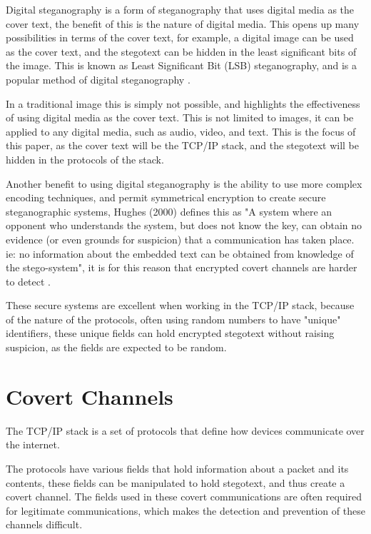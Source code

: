 Digital steganography is a form of steganography that uses digital media as the cover text, the benefit of this is the nature of digital media. This opens up many possibilities in terms of the cover text, for example, a digital image can be used as the cover text, and the stegotext can be hidden in the least significant bits of the image. This is known as Least Significant Bit (LSB) steganography, and is a popular method of digital steganography \cite{AESTfHD}.

In a traditional image this is simply not possible, and highlights the effectiveness of using digital media as the cover text. This is not limited to images, it can be applied to any digital media, such as audio, video, and text. This is the focus of this paper, as the cover text will be the TCP/IP stack, and the stegotext will be hidden in the protocols of the stack.

Another benefit to using digital steganography is the ability to use more complex encoding techniques, and permit symmetrical encryption to create secure steganographic systems, Hughes (2000) \cite{SaW} defines this as "A system where an opponent who understands the system, but does not know the key, can obtain no evidence (or even grounds for suspicion) that a communication has taken place. ie: no information about the embedded text can be obtained from knowledge of the stego-system", it is for this reason that encrypted covert channels are harder to detect \cite{CCitTCPIPPS}.

These secure systems are excellent when working in the TCP/IP stack, because of the nature of the protocols, often using random numbers to have "unique" identifiers, these unique fields can hold encrypted stegotext without raising suspicion, as the fields are expected to be random.

\section{Covert Channels}

The TCP/IP stack is a set of protocols that define how devices communicate over the internet.

The protocols have various fields that hold information about a packet and its contents, these fields can be manipulated to hold stegotext, and thus create a covert channel. The fields used in these covert communications are often required for legitimate communications, which makes the detection and prevention of these channels difficult.

